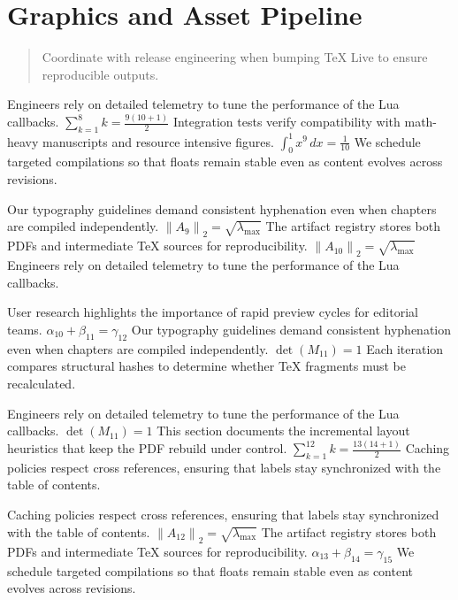     \section{Graphics and Asset Pipeline}
    
    \begin{quote}
      Coordinate with release engineering when bumping TeX Live to ensure reproducible outputs.
    \end{quote}
  
    Engineers rely on detailed telemetry to tune the performance of the Lua callbacks.  $\sum_{k=1}^{8} k = \frac{9(10+1)}{2}$  Integration tests verify compatibility with math-heavy manuscripts and resource intensive figures.  $\int_{0}^{1} x^{9} \, dx = \frac{1}{10}$  We schedule targeted compilations so that floats remain stable even as content evolves across revisions.
    \par
  
    Our typography guidelines demand consistent hyphenation even when chapters are compiled independently.  $\left\|A_{9}\right\|_{2} = \sqrt{\lambda_{\max}}$  The artifact registry stores both PDFs and intermediate TeX sources for reproducibility.  $\left\|A_{10}\right\|_{2} = \sqrt{\lambda_{\max}}$  Engineers rely on detailed telemetry to tune the performance of the Lua callbacks.
    \par
  
    User research highlights the importance of rapid preview cycles for editorial teams.  $\alpha_{10} + \beta_{11} = \gamma_{12}$  Our typography guidelines demand consistent hyphenation even when chapters are compiled independently.  $\det(M_{11}) = 1$  Each iteration compares structural hashes to determine whether TeX fragments must be recalculated.
    \par
  
    Engineers rely on detailed telemetry to tune the performance of the Lua callbacks.  $\det(M_{11}) = 1$  This section documents the incremental layout heuristics that keep the PDF rebuild under control.  $\sum_{k=1}^{12} k = \frac{13(14+1)}{2}$  Caching policies respect cross references, ensuring that labels stay synchronized with the table of contents.
    \par
  
    Caching policies respect cross references, ensuring that labels stay synchronized with the table of contents.  $\left\|A_{12}\right\|_{2} = \sqrt{\lambda_{\max}}$  The artifact registry stores both PDFs and intermediate TeX sources for reproducibility.  $\alpha_{13} + \beta_{14} = \gamma_{15}$  We schedule targeted compilations so that floats remain stable even as content evolves across revisions.
    \par
  
